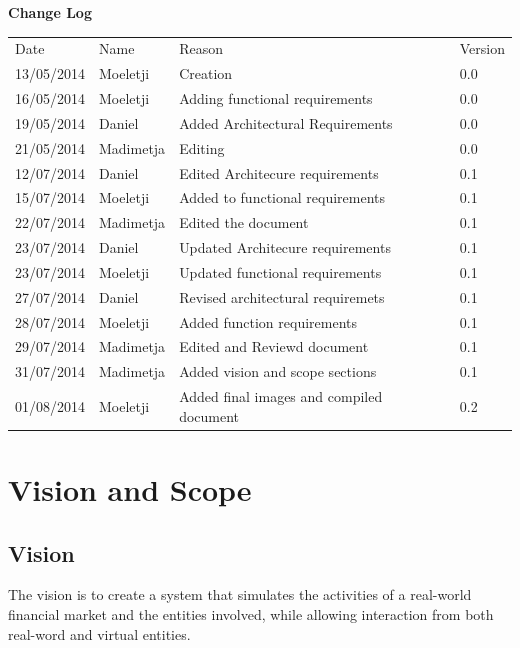 \documentclass[12pt]{article}
\begin{document}
	\newpage		
	\large 
 	{\bf Change Log}\\[1em]
	\begin{tabular}{llll}
		Date & Name & Reason & Version \\
		13/05/2014 & Moeletji & Creation & 0.0 \\
		16/05/2014 & Moeletji & Adding functional requirements & 0.0 \\
		19/05/2014 & Daniel & Added Architectural Requirements & 0.0 \\
		21/05/2014 & Madimetja & Editing & 0.0 \\
		12/07/2014 & Daniel & Edited Architecure requirements & 0.1 \\
		15/07/2014 & Moeletji & Added to functional requirements & 0.1 \\
		22/07/2014 & Madimetja & Edited the document & 0.1 \\
		23/07/2014 & Daniel & Updated Architecure requirements & 0.1\\
		23/07/2014 & Moeletji & Updated functional requirements & 0.1\\
		27/07/2014 & Daniel & Revised architectural requiremets & 0.1\\
		28/07/2014 & Moeletji & Added function requirements & 0.1\\
		29/07/2014 & Madimetja & Edited and Reviewd document & 0.1\\
		31/07/2014 & Madimetja & Added vision and scope sections & 0.1\\
		01/08/2014 & Moeletji & Added final images and compiled document & 0.2\\
	\end{tabular}
	
	\newpage
	\tableofcontents
				  
		\newpage
			\section{Vision and Scope}
				\subsection{Vision}
				The vision is to create a system that simulates the activities of a real-world financial market and the entities involved, while allowing interaction from both real-word and virtual entities.
				
\end{document}
